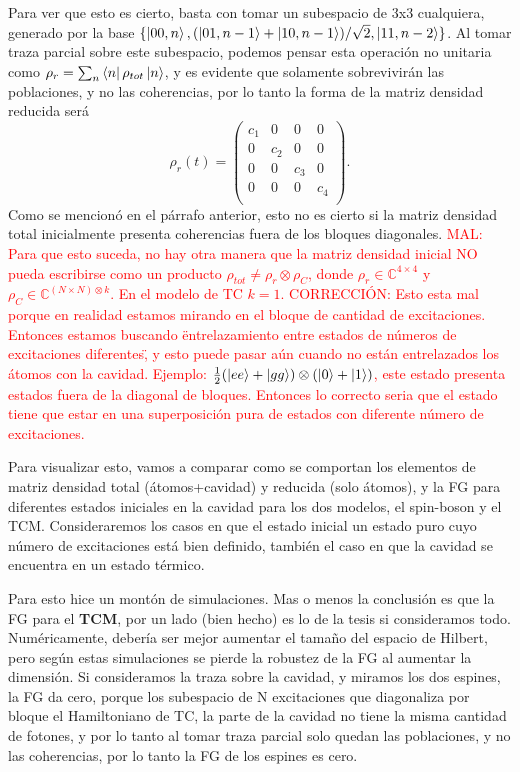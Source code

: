 Para ver que esto es cierto, basta con tomar un subespacio de 3x3 cualquiera, generado por la base $\{\ket{00,n},(\ket{01,n-1}+\ket{10,n-1})/\sqrt{2},\ket{11,n-2}\}$. Al tomar traza parcial sobre este subespacio, podemos pensar esta operación no unitaria como $\rho_r=\sum_n\bra{n}\rho_{tot}\ket{n}$, y es evidente que solamente sobrevivirán las poblaciones, y no las coherencias, por lo tanto la forma de la matriz densidad reducida será
\begin{equation}
    \rho_r(t)=\begin{pmatrix}
        c_1 & 0 & 0 & 0 \\
        0 & c_2 & 0 & 0 \\
        0 & 0 & c_3 & 0 \\
        0 & 0 & 0 & c_4 \\
    \end{pmatrix}.
\end{equation}
Como se mencionó en el párrafo anterior, esto no es cierto si la matriz densidad total inicialmente presenta coherencias fuera de los bloques diagonales. \textcolor{red}{MAL: Para que esto suceda, no hay otra manera que la matriz densidad inicial NO pueda escribirse como un producto $\rho_{tot}\neq\rho_r\otimes\rho_C$, donde $\rho_r\in\mathbb{C}^{4\times 4}$ y $\rho_C\in\mathbb{C}^{(N\times N)\otimes k}$. En el modelo de TC $k=1$. CORRECCIÓN: Esto esta mal porque en realidad estamos mirando en el bloque de cantidad de excitaciones. Entonces estamos buscando \"entrelazamiento entre estados de números de excitaciones diferentes\", y esto puede pasar aún cuando no están entrelazados los átomos con la cavidad. Ejemplo: $\frac{1}{2}(\ket{ee}+\ket{gg})\otimes(\ket{0}+\ket{1})$, este estado presenta estados fuera de la diagonal de bloques. Entonces lo correcto seria que el estado tiene que estar en una superposición pura de estados con diferente número de excitaciones.} 

Para visualizar esto, vamos a comparar como se comportan los elementos de matriz densidad total (átomos+cavidad) y reducida (solo átomos), y la FG para diferentes estados iniciales en la cavidad para los dos modelos, el spin-boson y el TCM. Consideraremos los casos en que el estado inicial un estado puro cuyo número de excitaciones está bien definido, también el caso en que la cavidad se encuentra en un estado térmico.

Para esto hice un montón de simulaciones. Mas o menos la conclusión es que la FG para el \textbf{TCM}, por un lado (bien hecho) es lo de la tesis si consideramos todo. Numéricamente, debería ser mejor aumentar el tamaño del espacio de Hilbert, pero según estas simulaciones se pierde la robustez de la FG al aumentar la dimensión. Si consideramos la traza sobre la cavidad, y miramos los dos espines, la FG da cero, porque los subespacio de N excitaciones que diagonaliza por bloque el Hamiltoniano de TC, la parte de la cavidad no tiene la misma cantidad de fotones, y por lo tanto al tomar traza parcial solo quedan las poblaciones, y no las coherencias, por lo tanto la FG de los espines es cero. 

